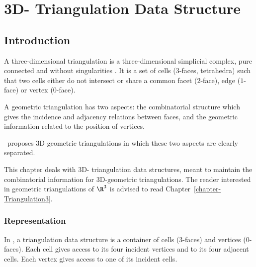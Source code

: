 \chapter{3D- Triangulation Data Structure}
\label{chapter-TDS3}

\section{Introduction}
\label{TDS3-sec-intro}

A three-dimensional triangulation is a three-dimensional simplicial
complex, pure connected and without singularities \cite{by-ag-98}. It
is a set of cells ($3$-faces, tetrahedra) such that two cells
either do not intersect or share a common facet ($2$-face), edge 
($1$-face) or vertex ($0$-face). 

A geometric triangulation has two aspects: the combinatorial structure which
gives the incidence and adjacency relations between faces, and the
geometric information related to the position of vertices.

\cgal\ proposes 3D geometric triangulations in which these
two aspects are clearly separated.

This chapter deals with 3D- triangulation data structures, meant to
maintain the combinatorial information for 3D-geometric
triangulations. The reader interested in geometric triangulations of
$\R^3$ is advised to read Chapter~\ref{chapter-Triangulation3}.

\subsection{Representation}
\label{TDS3-sec-def}

In \cgal, a triangulation data structure is a
container of cells ($3$-faces) and vertices ($0$-faces). Each cell gives
access to its four incident vertices and to its four adjacent
cells. Each vertex gives access to one of its incident cells.

